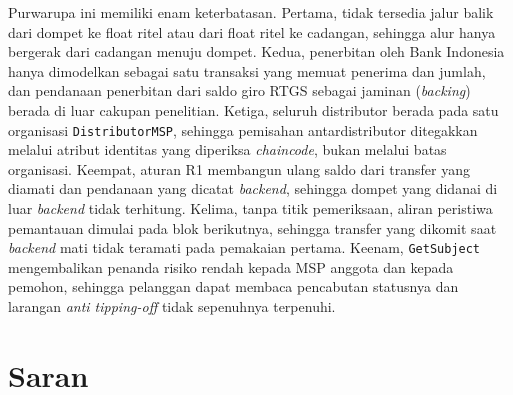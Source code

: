 Purwarupa ini memiliki enam keterbatasan. Pertama, tidak tersedia jalur balik dari dompet ke float ritel atau dari float ritel ke cadangan, sehingga alur hanya bergerak dari cadangan menuju dompet. Kedua, penerbitan oleh Bank Indonesia hanya dimodelkan sebagai satu transaksi yang memuat penerima dan jumlah, dan pendanaan penerbitan dari saldo giro RTGS sebagai jaminan (\textit{backing}) berada di luar cakupan penelitian. Ketiga, seluruh distributor berada pada satu organisasi \texttt{DistributorMSP}, sehingga pemisahan antardistributor ditegakkan melalui atribut identitas yang diperiksa \textit{chaincode}, bukan melalui batas organisasi. Keempat, aturan R1 membangun ulang saldo dari transfer yang diamati dan pendanaan yang dicatat \textit{backend}, sehingga dompet yang didanai di luar \textit{backend} tidak terhitung. Kelima, tanpa titik pemeriksaan, aliran peristiwa pemantauan dimulai pada blok berikutnya, sehingga transfer yang dikomit saat \textit{backend} mati tidak teramati pada pemakaian pertama. Keenam, \texttt{GetSubject} mengembalikan penanda risiko rendah kepada MSP anggota dan kepada pemohon, sehingga pelanggan dapat membaca pencabutan statusnya dan larangan \textit{anti tipping-off} tidak sepenuhnya terpenuhi.

\section{Saran}

